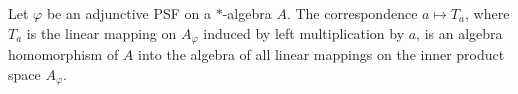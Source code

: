 Let $\varphi$ be an adjunctive PSF on a $*$-algebra $A$. The correspondence $a \mapsto T_a$, where $T_a$ is the linear mapping on $A_\varphi$ induced by left multiplication by $a$, is an algebra homomorphism of $A$ into the algebra of all linear mappings on the inner product space $A_\varphi$.
